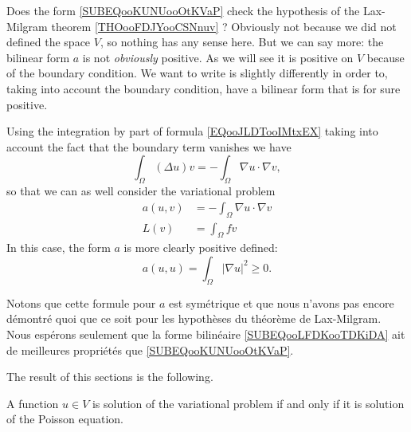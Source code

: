 Does the form \eqref{SUBEQooKUNUooOtKVaP} check the hypothesis of the Lax-Milgram theorem \ref{THOooFDJYooCSNnuv} ? Obviously not because we did not defined the space \( V\), so nothing has any sense here. But we can say more: the bilinear form \( a\) is not \emph{obviously} positive. As we will see it is positive on \( V\) because of the boundary condition. We want to write is slightly differently in order to, taking into account the boundary condition, have a bilinear form that is for sure positive.

Using the integration by part of formula \eqref{EQooJLDTooIMtxEX} taking into account the fact that the boundary term vanishes we have
\begin{equation}
    \int_{\Omega}(\Delta u)v=-\int_{\Omega}\nabla u\cdot \nabla v,
\end{equation}
so that we can as well consider the variational problem
\begin{subequations}
    \begin{align}
        a(u,v)&=-\int_{\Omega}\nabla u\cdot \nabla v   \label{SUBEQooLFDKooTDKiDA}\\
        L(v)&=\int_{\Omega}fv
    \end{align}
\end{subequations}
In this case, the form \( a\) is more clearly positive defined:
\begin{equation}
    a(u,u)=\int_{\Omega}| \nabla u |^2\geq 0.
\end{equation}

Notons que cette formule pour \( a\) est symétrique et que nous n'avons pas encore démontré quoi que ce soit pour les hypothèses du théorème de Lax-Milgram. Nous espérons seulement que la forme bilinéaire \eqref{SUBEQooLFDKooTDKiDA} ait de meilleures propriétés que \eqref{SUBEQooKUNUooOtKVaP}.

The result of this sections is the following.
\begin{proposition}
    A function \( u\in V\) is solution of the variational problem if and only if it is solution of the Poisson equation.
\end{proposition}

